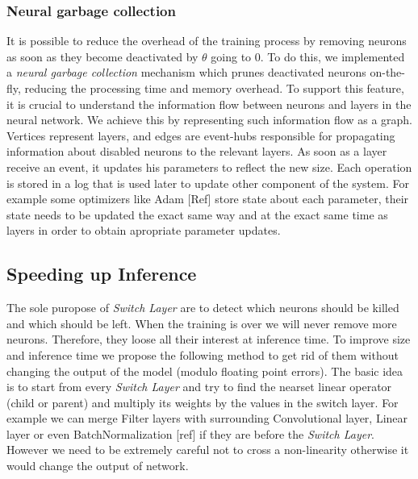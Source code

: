 \subsubsection{Neural garbage collection}

It is possible to reduce the overhead of the training process by removing
neurons as soon as they become deactivated by $\theta$ going to 0.
To do this, we implemented a \emph{neural garbage collection} mechanism which
prunes deactivated neurons on-the-fly,  reducing the processing time
and memory overhead. To support this feature, it is crucial to understand the
information flow between neurons and layers in the neural network. We achieve
this by representing such information flow as a graph. Vertices represent layers,
and edges are event-hubs responsible for propagating information about disabled
neurons to the relevant layers. As soon as a layer receive an event, it updates
his parameters to reflect the new size. Each operation is stored in a log that
is used later to update other component of the system. For example some
optimizers like Adam [Ref] store state about each parameter, their state needs
to be updated the exact same way and at the exact same time as layers in order
to obtain apropriate parameter updates.

\subsection{Speeding up Inference}

The sole puropose of \textit{Switch Layer} are to detect which neurons should be
killed and which should be left. When the training is over we will never remove
more neurons. Therefore, they loose all their interest at inference time. To
improve size and inference time we propose the following method to get rid of
them without changing the output of the model (modulo floating point errors).
The basic idea is to start from every \textit{Switch Layer} and try to find the
nearset linear operator (child or parent) and multiply its weights by the values
in the switch layer. For example we can merge Filter layers with surrounding
Convolutional layer, Linear layer or even BatchNormalization [ref] if they are
before the \textit{Switch Layer}. However we need to be extremely careful not to
cross a non-linearity otherwise it would change the output of network.